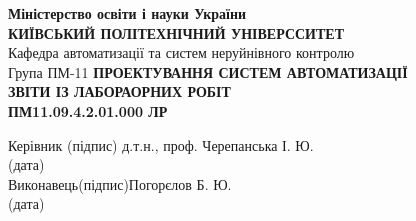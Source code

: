 \documentclass[a4paper]{article}
\begin{document}
\thispagestyle{empty}
\centering
\textbf{Міністерство освіти і науки України}\\
\textbf{КИЇВСЬКИЙ ПОЛІТЕХНІЧНИЙ УНІВЕРССИТЕТ}\\[2cm]
\raggedleft
Кафедра автоматизації та систем неруйнівного контролю\\
Група ПМ-11
\vfill
\centering
\textbf{ПРОЕКТУВАННЯ СИСТЕМ АВТОМАТИЗАЦІЇ}\\[1cm]
\textbf{ЗВІТИ ІЗ ЛАБОРАОРНИХ РОБІТ}\\[1cm]
\textbf{ПМ11.09.4.2.01.000 ЛР}
\vfill
\begin{flushleft}
    Керівник  \qquad\qquad\quad \hfill\qquad (підпис)\hfill 
    д.т.н., проф. Черепанська І. Ю.\\
    \hfill (дата)\\[2cm]
    Виконавець\hfill (підпис)\hfill Погорєлов Б. Ю.\\
    \hfill (дата)
\end{flushleft}
\vfill
{}
\newpage


\end{document}
